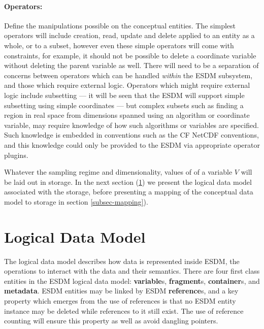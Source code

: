 \paragraph{Operators:} Define the manipulations possible on the conceptual entities. The simplest operators will include creation, read, update and delete applied to an entity as a whole, or to a subset, however even these simple operators will come with constraints, for example, it should not  be possible to delete a coordinate variable without deleting the parent variable as well. There will need to be a separation of concerns between operators which can be handled  \textit{within} the ESDM subsystem, and those which require external logic. Operators which might require external logic include subsetting --- it will be seen that the ESDM will support simple subsetting using simple coordinates ---  but complex subsets such as finding a region in real space from dimensions spanned using an algorithm or coordinate variable, may require knowledge of how such algorithms or variables are specified.
Such knowledge is embedded in conventions such as the CF NetCDF conventions, and this knowledge could only be provided to the ESDM via appropriate operator plugins.




Whatever the sampling regime and dimensionality, values of of a variable $V$ will be laid out in storage. In the next section (\ref{subsec-ldm}) we present the logical data model associated with the storage, before presenting a mapping of the conceptual data model to storage in section \ref{subsec-mapping}).


\section{Logical Data Model}
\label {subsec-ldm}

The logical data model describes how data is represented inside ESDM, the operations to interact with the data and their semantics. There are four first class entities in the ESDM logical data model: \textbf{variable}s, \textbf{fragment}s, \textbf{container}s, and \textbf{metadata}. ESDM entities may be linked by ESDM \textbf{reference}s, and a key property which emerges from the use of references is that no ESDM entity instance may be deleted while references to it still exist. The use of reference counting will ensure this property as well as avoid dangling pointers.

